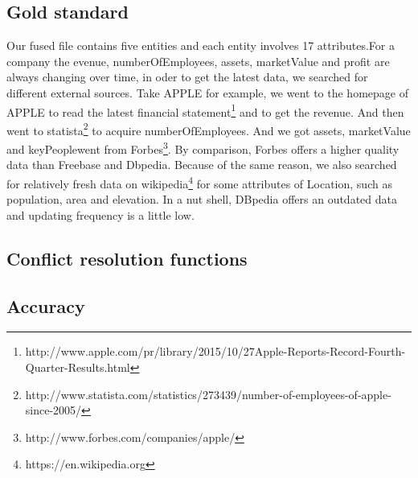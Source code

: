 \subsection{Gold standard}
Our fused file contains five entities and each entity involves 17 attributes.For a company the evenue, numberOfEmployees, assets, marketValue and profit are always changing over time, in oder to get the latest data, we searched for different external sources. Take APPLE for example, we went to the homepage of APPLE  to read the latest financial statement\footnote{http://www.apple.com/pr/library/2015/10/27Apple-Reports-Record-Fourth-Quarter-Results.html} and to get the revenue. And then went to statista\footnote{http://www.statista.com/statistics/273439/number-of-employees-of-apple-since-2005/} to acquire numberOfEmployees. And we got assets, marketValue and keyPeoplewent from Forbes\footnote{http://www.forbes.com/companies/apple/}. By comparison, Forbes offers a higher quality data than Freebase and Dbpedia. Because of the same reason, we also searched for relatively fresh data on wikipedia\footnote{https://en.wikipedia.org} for some attributes of Location, such as population, area and elevation. In a nut shell, DBpedia offers an outdated data and updating frequency is a little low. 


\subsection{Conflict resolution functions}


\subsection{Accuracy}
